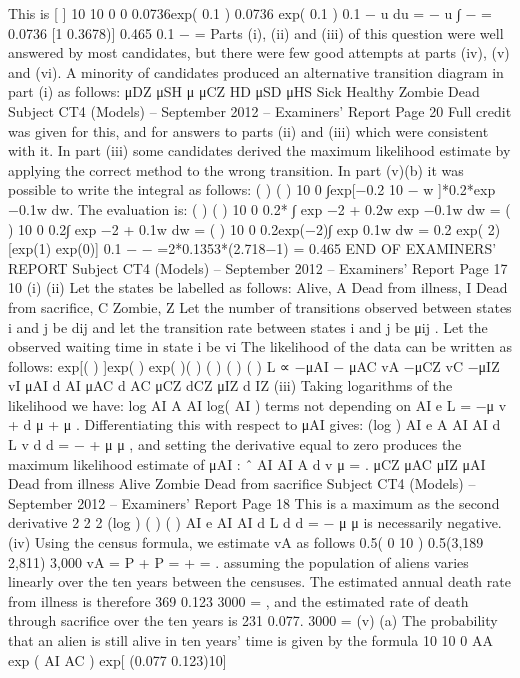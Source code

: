 This is
[ ]
10
10
0
0
0.0736exp( 0.1 ) 0.0736 exp( 0.1 )
0.1
− u du = − u
∫ −
= 0.0736 [1 0.3678)] 0.465
0.1
− =
Parts (i), (ii) and (iii) of this question were well answered by most candidates, but there were
few good attempts at parts (iv), (v) and (vi). A minority of candidates produced an
alternative transition diagram in part (i) as follows:
μDZ
μSH
μ μCZ HD μSD
μHS
Sick
Healthy
Zombie
Dead
Subject CT4 (Models) – September 2012 – Examiners’ Report
Page 20
Full credit was given for this, and for answers to parts (ii) and (iii) which were consistent
with it. In part (iii) some candidates derived the maximum likelihood estimate by applying
the correct method to the wrong transition. In part (v)(b) it was possible to write the integral
as follows:
( ) ( )
10
0
∫exp[−0.2 10 − w ]*0.2*exp −0.1w dw.
The evaluation is:
( ) ( )
10
0
0.2* ∫ exp −2 + 0.2w exp −0.1w dw
= ( )
10
0
0.2∫ exp −2 + 0.1w dw
= ( )
10
0
0.2exp(−2)∫ exp 0.1w dw
= 0.2 exp( 2)[exp(1) exp(0)]
0.1
− −
=2*0.1353*(2.718−1) = 0.465
END OF EXAMINERS’ REPORT
Subject CT4 (Models) – September 2012 – Examiners’ Report
Page 17
10
(i)
(ii) Let the states be labelled as follows:
Alive, A
Dead from illness, I
Dead from sacrifice, C
Zombie, Z
Let the number of transitions observed between states i and j be dij
and let the transition rate between states i and j be μij .
Let the observed waiting time in state i be vi
The likelihood of the data can be written as follows:
exp[( ) ]exp( ) exp( )( ) ( ) ( ) ( ) L ∝ −μAI − μAC vA −μCZ vC −μIZ vI μAI d AI μAC d AC μCZ dCZ μIZ d IZ
(iii) Taking logarithms of the likelihood we have:
log AI A AI log( AI ) terms not depending on AI
e L = −μ v + d μ + μ .
Differentiating this with respect to μAI gives:
(log ) AI
e A
AI AI
d L v d
d
= − +
μ μ
,
and setting the derivative equal to zero produces the maximum likelihood estimate of
μAI :
ˆ
AI
AI
A
d
v
μ = .
μCZ
μAC μIZ
μAI
Dead from illness
Alive
Zombie
Dead from sacrifice
Subject CT4 (Models) – September 2012 – Examiners’ Report
Page 18
This is a maximum as the second derivative
2
2 2
(log )
( ) ( )
AI
e
AI AI
d L d
d
= −
μ μ
is necessarily negative.
(iv) Using the census formula, we estimate vA as follows
0.5( 0 10 ) 0.5(3,189 2,811) 3,000 vA = P + P = + = .
assuming the population of aliens varies linearly over the ten years between the
censuses.
The estimated annual death rate from illness is therefore
369 0.123
3000
= ,
and the estimated rate of death through sacrifice over the ten years is
231 0.077.
3000
=
(v) (a) The probability that an alien is still alive in ten years’ time
is given by the formula
10
10
0
AA exp ( AI AC ) exp[ (0.077 0.123)10]
